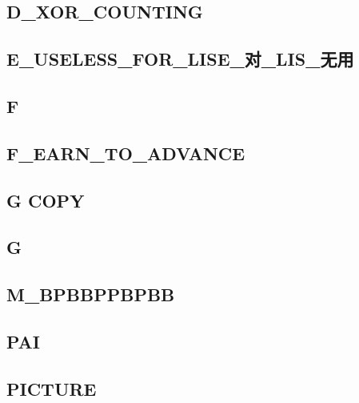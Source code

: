 \subsection{D_XOR_COUNTING}
\raggedbottom
\hrulefill

\subsection{E_USELESS_FOR_LISE_对_LIS_无用}
\raggedbottom
\hrulefill

\subsection{F}
\raggedbottom
\hrulefill

\subsection{F_EARN_TO_ADVANCE}
\raggedbottom
\hrulefill

\subsection{G COPY}
\raggedbottom
\hrulefill

\subsection{G}
\raggedbottom
\hrulefill

\subsection{M_BPBBPPBPBB}
\raggedbottom
\hrulefill

\subsection{PAI}
\raggedbottom
\hrulefill

\subsection{PICTURE}
\raggedbottom
\hrulefill

